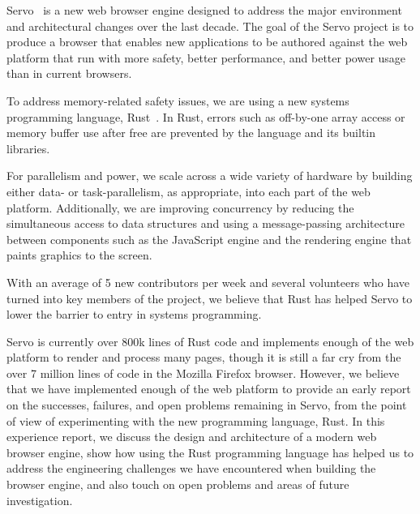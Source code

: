 Servo~\cite{SERVO} is a new web browser engine designed to address the major environment and 
architectural changes over the last decade.
The goal of the Servo project is to produce a browser that enables new applications to be authored
against the web platform that run with more safety, better performance, and better power usage
than in current browsers.

To address memory-related safety issues, we are using a new systems programming language,
Rust~\cite{RUST}.
In Rust, errors such as off-by-one array access or memory buffer use after free are
prevented by the language and its builtin libraries.

For parallelism and power, we scale across a wide variety of hardware by building either data-
or task-parallelism, as appropriate, into each part of the web platform.
Additionally, we are improving concurrency by reducing the simultaneous access to data
structures and using a message-passing architecture between components such as the
JavaScript engine and the rendering engine that paints graphics to the screen.

With an average of 5 new contributors per week and several volunteers who have turned
into key members of the project, we believe that Rust has helped Servo to lower the
barrier to entry in systems programming.

Servo is currently over 800k lines of Rust code and implements enough of the web platform to render and
process many pages, though it is still a far cry from the over 7 million lines of code in
the Mozilla Firefox browser.
However, we believe that we have implemented enough of the web platform to provide an
early report on the successes, failures, and open problems remaining in Servo, from the
point of view of experimenting with the new programming language, Rust.
In this experience report, we discuss the design and architecture of a modern web 
browser engine, show how using the Rust programming language has helped us to address the
engineering challenges we have encountered when building the browser engine, and also touch on
open problems and areas of future investigation.

